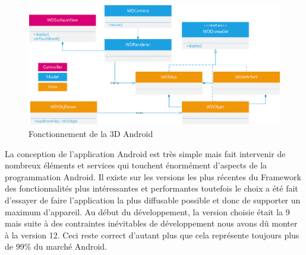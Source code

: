 \begin{figure}[H]
    \centering
    \includegraphics[width=\textwidth]{./img/android-3d.png}
    \caption{Fonctionnement de la 3D Android}
    \label{3d}
\end{figure}

La conception de l’application Android est très simple mais fait intervenir de nombreux éléments et services qui touchent énormément d’aspects de la programmation Android. Il existe sur les versions les plus récentes du Framework des fonctionnalités plus intéressantes et performantes toutefois le choix a été fait d’essayer de faire l’application la plus diffusable possible et donc de supporter un maximum d’appareil. Au début du développement, la version choisie était la 9 mais suite à des contraintes inévitables de développement nous avons dû monter à la version 12. Ceci reste correct d’autant plus que cela représente toujours plus de 99\% du marché Android.